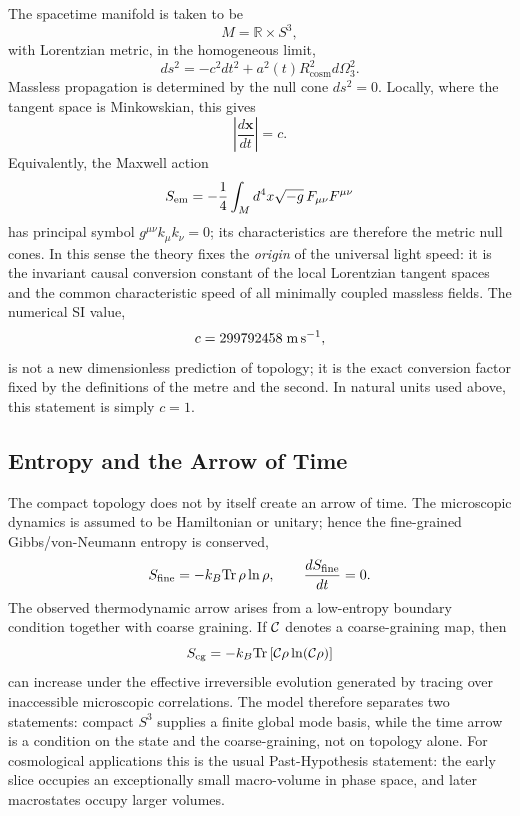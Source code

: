 \documentclass[
  aps,
  prd,
  reprint,
  superscriptaddress,
  nofootinbib,
  longbibliography,
  floatfix,
  amsmath,
  amssymb
]{revtex4-2}
\theoremstyle{plain}
\theoremstyle{definition}
\theoremstyle{remark}
\newcommand{\Rcosm}{R_{\mathrm{cosm}}}
\begin{document}
The spacetime manifold is taken to be
\begin{equation}
  M=\mathbb R\times S^3,
\end{equation}
with Lorentzian metric, in the homogeneous limit,
\begin{equation}
  ds^2=-c^2dt^2+a^2(t)\Rcosm^2 d\Omega_3^2 .
\end{equation}
Massless propagation is determined by the null cone \(ds^2=0\). Locally,
where the tangent space is Minkowskian, this gives
\begin{equation}
  \left|\frac{d\mathbf x}{dt}\right| = c .
\end{equation}
Equivalently, the Maxwell action
\begin{equation}
  S_{\rm em}=-\frac14\int_M d^4x\sqrt{-g}\,F_{\mu\nu}F^{\mu\nu}
\end{equation}
has principal symbol \(g^{\mu\nu}k_\mu k_\nu=0\); its characteristics are
therefore the metric null cones. In this sense the theory fixes the
\emph{origin} of the universal light speed: it is the invariant causal
conversion constant of the local Lorentzian tangent spaces and the
common characteristic speed of all minimally coupled massless fields.
The numerical SI value,
\begin{equation}
  c=299792458\;{\rm m\,s^{-1}},
\end{equation}
is not a new dimensionless prediction of topology; it is the exact
conversion factor fixed by the definitions of the metre and the second.
In natural units used above, this statement is simply \(c=1\).

\subsection{Entropy and the Arrow of Time}

The compact topology does not by itself create an arrow of time. The
microscopic dynamics is assumed to be Hamiltonian or unitary; hence the
fine-grained Gibbs/von-Neumann entropy is conserved,
\begin{equation}
  S_{\rm fine}=-k_B{\rm Tr}\,\rho\ln\rho,\qquad
  \frac{dS_{\rm fine}}{dt}=0 .
\end{equation}
The observed thermodynamic arrow arises from a low-entropy boundary
condition together with coarse graining. If \({\cal C}\) denotes a
coarse-graining map, then
\begin{equation}
  S_{\rm cg}=-k_B{\rm Tr}\,[{\cal C}\rho\ln({\cal C}\rho)]
\end{equation}
can increase under the effective irreversible evolution generated by
tracing over inaccessible microscopic correlations. The model therefore
separates two statements: compact \(S^3\) supplies a finite global mode
basis, while the time arrow is a condition on the state and the
coarse-graining, not on topology alone. For cosmological applications
this is the usual Past-Hypothesis statement: the early slice occupies an
exceptionally small macro-volume in phase space, and later macrostates
occupy larger volumes.
\end{document}
